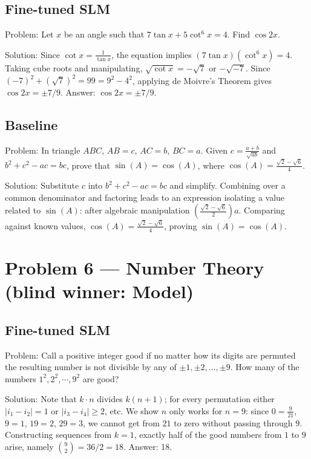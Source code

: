 \documentclass[11pt]{article}
\begin{document}
\subsection*{Fine-tuned SLM}

Problem:
Let $x$ be an angle such that $7 \tan x + 5 \cot^6 x = 4$. Find $\cos 2x$.

Solution:
Since $\cot x = \frac{1}{\tan x}$, the equation implies $(7\tan x)(\cot^6 x)=4$. Taking cube roots and manipulating, $\sqrt{\cot x}=-\sqrt 7$ or $-\sqrt{-7}$. Since $(-7)^2+(\sqrt7)^2 = 99 = 9^2-4^2$, applying de Moivre's Theorem gives $\cos 2x = \pm 7/9$. Answer: $\cos 2x = \pm 7/9$.

\subsection*{Baseline}

Problem:
In triangle $ABC$, $AB=c$, $AC=b$, $BC=a$. Given $c = \frac{a+b}{\sqrt{ab}}$ and $b^2 + c^2 - ac = bc$, prove that $\sin(A) = \cos(A)$, where $\cos(A) = \frac{\sqrt{2}-\sqrt{6}}{4}$.

Solution:
Substitute $c$ into $b^2 + c^2 - ac = bc$ and simplify. Combining over a common denominator and factoring leads to an expression isolating a value related to $\sin(A)$: after algebraic manipulation $(\frac{\sqrt{2}-\sqrt{6}}{2})a$. Comparing against known values, $\cos(A) = \frac{\sqrt{2}-\sqrt{6}}{4}$, proving $\sin(A) = \cos(A)$.

\section*{Problem 6 --- Number Theory \quad(blind winner: Model)}

\subsection*{Fine-tuned SLM}

Problem:
Call a positive integer good if no matter how its digits are permuted the resulting number is not divisible by any of $\pm1,\pm2,\ldots,\pm9$. How many of the numbers $1^{2}, 2^{2}, \cdots, 9^{2}$ are good?

Solution:
Note that $k\cdot n$ divides $k(n+1)$; for every permutation either $|i_1-i_2|=1$ or $|i_3-i_4|\ge 2$, etc. We show $n$ only works for $n=9$: since $0=\frac{9}{21}$, $9=1$, $19=2$, $29=3$, we cannot get from $21$ to zero without passing through $9$. Constructing sequences from $k=1$, exactly half of the good numbers from $1$ to $9$ arise, namely $\binom92=36/2=18$. Answer: 18.
\end{document}
